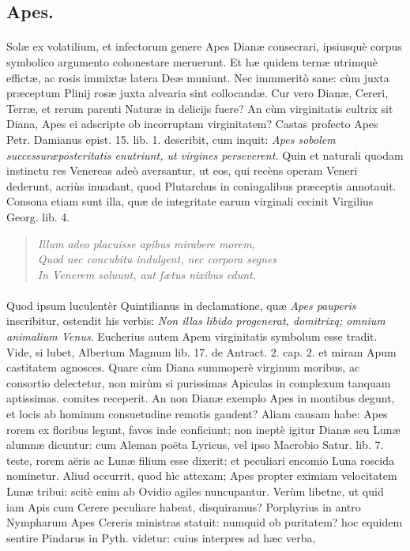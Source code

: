 \documentclass[a4paper, 11pt, oneside, polutonikogreek, latin]{article}
\begin{document}
\subsection{Apes.}
\paragraph{}
Solæ ex volatilium, et infectorum genere Apes Dianæ consecrari, ipsiusquè corpus symbolico argumento cohonestare meruerunt. Et hæ quidem ternæ utrimquè effictæ, ac rosis immixtæ latera Deæ muniunt. Nec immmeritò sane: cùm juxta præceptum Plinij rosæ juxta alvearia sint collocandæ. Cur vero Dianæ, Cereri, Terræ, et rerum parenti Naturæ in delicijs fuere? An cùm virginitatis cultrix sit Diana, Apes ei adscripte ob incorruptam virginitatem? Castas profecto Apes Petr. Damianus epist. 15. lib. 1. describit, cum inquit: \emph{Apes sobolem successuræposteritatis enutriunt, ut virgines perseverent.} Quin et naturali quodam instinctu res Venereas adeò aversantur, ut eos, qui recèns operam Veneri dederunt, acriùs inuadant, quod Plutarchus in coniugalibus præceptis annotauit. Consona etiam sunt illa, quæ de integritate earum virginali cecinit Virgilius Georg. lib. 4.
\begin{quote}
\emph{Illum adeo placuisse apibus mirabere morem,}\\
\emph{Quod nec concubitu indulgent, nec corpora segnes}\\
\emph{In Venerem soluunt, aut fætus nixibus edunt.}\\
\end{quote}
\paragraph{}
Quod ipsum luculentèr Quintilianus in declamatione, quæ \emph{Apes pauperis} inscribitur, ostendit his verbis: \emph{Non illas libido progenerat, domitrixq; omnium animalium Venus}. Eucherius autem Apem virginitatis symbolum esse tradit. Vide, si lubet, Albertum Magnum lib. 17. de Antract. 2. cap. 2. et miram Apum castitatem agnosces. Quare cùm Diana summoperè virginum moribus, ac consortio delectetur, non mirùm si purissimas Apiculas in complexum tanquam aptissimas. comites receperit. An non Dianæ exemplo Apes in montibus degunt, et locis ab hominum consuetudine remotis gaudent? Aliam causam habe: Apes rorem ex floribus legunt, favos inde conficiunt; non ineptè igitur Dianæ seu Lunæ alumnæ dicuntur: cum Aleman poëta Lyricus, vel ipso Macrobio Satur. lib. 7. teste, rorem aëris ac Lunæ filium esse dixerit: et peculiari encomio Luna roscida nominetur. Aliud occurrit, quod hìc attexam; Apes propter eximiam velocitatem Lunæ tribui: scitè enim ab Ovidio agiles nuncupantur. Verùm libetne, ut quid iam Apis cum Cerere peculiare habeat, disquiramus? Porphyrius in antro Nympharum Apes Cereris ministras statuit: numquid ob puritatem? hoc equidem sentire Pindarus in Pyth. videtur: cuius interpres ad hæc verba,
\end{document}

